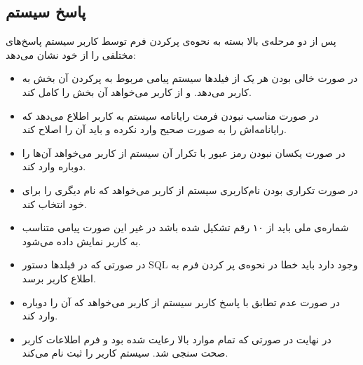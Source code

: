 \documentclass[a4paper]{article}
\begin{document}
\subsection{پاسخ سیستم}
پس از دو مرحله‌ی بالا بسته به نحوه‌ی پرکردن فرم توسط کاربر سیستم پاسخ‌های مختلفی را از خود نشان می‌دهد:
\begin{itemize}
\item
در صورت خالی بودن هر یک از فیلدها سیستم پیامی مربوط به پرکردن آن بخش به کاربر می‌دهد. و از کاربر می‌خواهد آن بخش را کامل کند.
\item
در صورت مناسب نبودن فرمت رایانامه سیستم به کاربر اطلاع می‌دهد که رایانامه‌اش را به صورت صحیح وارد نکرده و باید آن را اصلاح کند.
\item
در صورت یکسان نبودن رمز عبور با تکرار آن سیستم از کاربر می‌خواهد آن‌ها را دوباره وارد کند.
\item
در صورت تکراری بودن نام‌کاربری سیستم از کاربر می‌خواهد که نام دیگری را برای خود انتخاب کند.
\item
شماره‌ی ملی باید از ۱۰ رقم تشکیل شده باشد در غیر این صورت پیامی متناسب به کاربر نمایش داده می‌شود.
\item
در صورتی که در فیلد‌ها دستور SQL وجود دارد باید خطا در نحوه‌ی پر کردن فرم به اطلاع کاربر برسد.
\item
در صورت عدم تطابق  با پاسخ کاربر سیستم از کاربر می‌خواهد که آن را دوباره وارد کند.
\item
در نهایت در صورتی که تمام موارد بالا رعایت شده بود و فرم اطلاعات کاربر صحت سنجی شد. سیستم کاربر را ثبت نام می‌کند.
\end{itemize}
\end{document}
